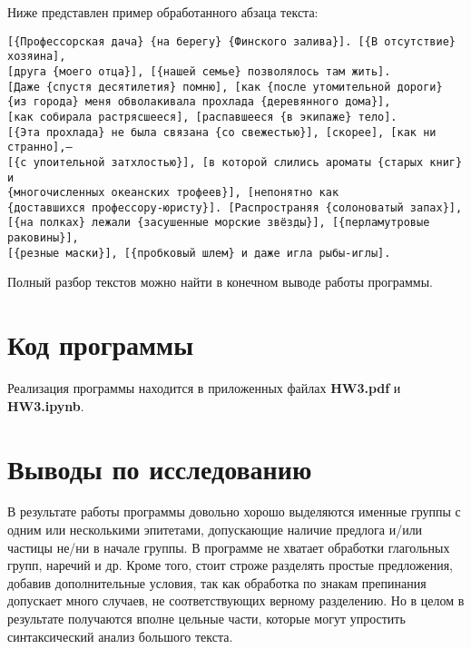\documentclass[oneside,final,12pt]{article}
\begin{document}
Ниже представлен пример обработанного абзаца текста:
\begin{verbatim}
[{Профессорская дача} {на берегу} {Финского залива}]. [{В отсутствие} хозяина],
[друга {моего отца}], [{нашей семье} позволялось там жить].
[Даже {спустя десятилетия} помню], [как {после утомительной дороги}
{из города} меня обволакивала прохлада {деревянного дома}],
[как собирала растрясшееся], [распавшееся {в экипаже} тело].
[{Эта прохлада} не была связана {со свежестью}], [скорее], [как ни странно],—
[{с упоительной затхлостью}], [в которой слились ароматы {старых книг} и
{многочисленных океанских трофеев}], [непонятно как
{доставшихся профессору-юристу}]. [Распространяя {солоноватый запах}],
[{на полках} лежали {засушенные морские звёзды}], [{перламутровые раковины}],
[{резные маски}], [{пробковый шлем} и даже игла рыбы-иглы].
\end{verbatim}

Полный разбор текстов можно найти в конечном выводе работы программы.

\section{Код программы}

Реализация программы находится в приложенных файлах \textbf{HW3.pdf} и \textbf{HW3.ipynb}.

\section{Выводы по исследованию}

В результате работы программы довольно хорошо выделяются именные группы с одним или несколькими эпитетами, допускающие наличие предлога и/или частицы не/ни в начале группы. В программе не хватает обработки глагольных групп, наречий и др. Кроме того, стоит строже разделять простые предложения, добавив дополнительные условия, так как обработка по знакам препинания допускает много случаев, не соответствующих верному разделению. Но в целом в результате получаются вполне цельные части, которые могут упростить синтаксический анализ большого текста.
\end{document}
